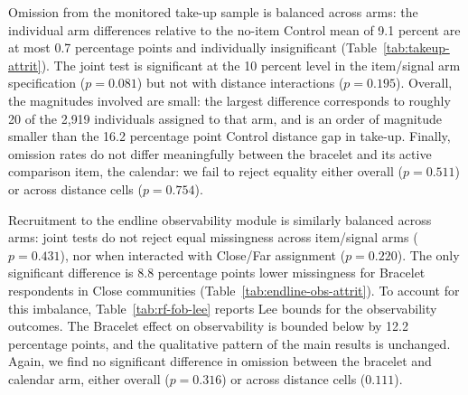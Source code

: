 \documentclass[ECM\space ReStud.tex]{subfiles}
\begin{document}
Omission from the monitored take-up sample is balanced across
arms: the individual arm differences relative to the no-item Control
mean of 9.1 percent are at most 0.7 percentage points and individually
insignificant (Table~\ref{tab:takeup-attrit}). The joint test is
significant at the 10 percent level in the item/signal arm specification
(\(p = 0.081\)) but not with distance interactions (\(p = 0.195\)). Overall, the magnitudes involved are small: the largest difference corresponds to roughly 20 of
the  2{,}919 individuals assigned to that arm, and is an
order of magnitude smaller than the 16.2 percentage point Control
distance gap in take-up. Finally, omission rates do not differ meaningfully between the bracelet and its active comparison item, the calendar: we fail to reject equality either overall (\(p=0.511\)) or across distance cells (\(p=0.754\)).


Recruitment to the endline observability module is similarly balanced across
arms: joint tests do not reject equal missingness across item/signal arms (\(p = 0.431\)), nor when interacted with Close/Far assignment (\(p = 0.220\)). The only significant difference is 8.8 percentage points lower missingness for Bracelet respondents in Close communities (Table~\ref{tab:endline-obs-attrit}). To account for this imbalance, Table~\ref{tab:rf-fob-lee} reports Lee
bounds for the observability outcomes. The Bracelet effect on
observability is bounded below by 12.2 percentage points, and the
qualitative pattern of the main results is unchanged. Again, we find no significant difference in omission between the bracelet and calendar arm, either overall (\(p=0.316\)) or across distance cells (\(0.111\)).
\end{document}
